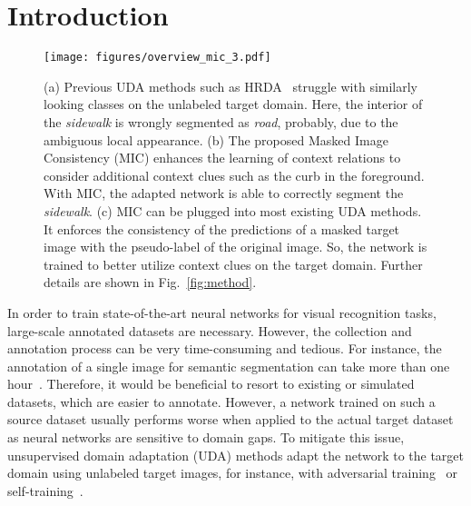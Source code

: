 \documentclass[10pt,twocolumn,letterpaper]{article}
\begin{document}
\section{Introduction}
\label{sec:intro}

\begin{figure}
    \centering
    \texttt{[image: figures/overview\_mic\_3.pdf]}
    \caption{(a) Previous UDA methods such as HRDA~\cite{hoyer2022hrda} struggle with similarly looking classes on the unlabeled target domain. Here, the interior of the \emph{sidewalk} is wrongly segmented as \emph{road}, probably, due to the ambiguous local appearance.
    (b) The proposed Masked Image Consistency (MIC) enhances the learning of context relations to consider additional context clues such as the curb in the foreground. With MIC, the adapted network is able to correctly segment the \emph{sidewalk}.
    (c) MIC can be plugged into most existing UDA methods. It enforces the consistency of the predictions of a masked target image with the pseudo-label of the original image. So, the network is trained to better utilize context clues on the target domain. Further details are shown in Fig.~\ref{fig:method}. 
    }
    \label{fig:overview}
\end{figure}

In order to train state-of-the-art neural networks for visual recognition tasks, large-scale annotated datasets are necessary. However, the collection and annotation process can be very time-consuming and tedious. For instance, the annotation of a single image for semantic segmentation can take more than one hour~\cite{cordts2016cityscapes, sarkadis2021acdc}. Therefore, it would be beneficial to resort to existing or simulated datasets, which are easier to annotate. However, a network trained on such a source dataset usually performs worse when applied to the actual target dataset as neural networks are sensitive to domain gaps. To mitigate this issue, unsupervised domain adaptation (UDA) methods adapt the network to the target domain using unlabeled target images, for instance, with adversarial training~\cite{hoffman2018cycada, tsai2018learning, gong2021dlow, rangwani2022closer} or self-training~\cite{zou2018unsupervised, tranheden2021dacs, wang2021domain, hoyer2021daformer, hoyer2022hrda}.
\end{document}
